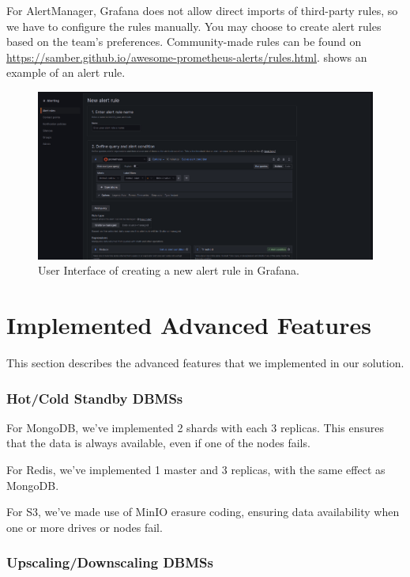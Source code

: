 \documentclass{report}
\begin{document}
    For AlertManager, Grafana does not allow direct imports of third-party rules, so we have to configure the rules manually. You may choose to create alert rules based on the team's preferences. Community-made rules can be found on \url{https://samber.github.io/awesome-prometheus-alerts/rules.html}.  shows an example of an alert rule.

    \begin{figure}[h]
        \centering
        \includegraphics[width=\textwidth]{images/alerting-create}
        \caption{User Interface of creating a new alert rule in Grafana.}
        \label{fig:alerting-create}
    \end{figure}

    \section{Implemented Advanced Features}\label{sec:advanced-requirements}
    This section describes the advanced features that we implemented in our solution.
    \subsubsection{Hot/Cold Standby DBMSs}
    For MongoDB, we've implemented 2 shards with each 3 replicas. This ensures that the data is always available, even if one of the nodes fails.

    For Redis, we've implemented 1 master and 3 replicas, with the same effect as MongoDB.

    For S3, we've made use of MinIO erasure coding, ensuring data availability when one or more drives or nodes fail.

    \subsubsection{Upscaling/Downscaling DBMSs}
\end{document}
